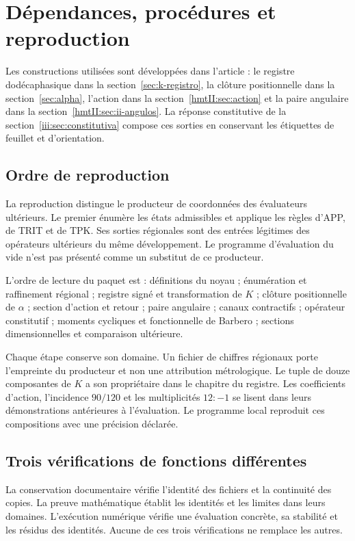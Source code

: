 \section{Dépendances, procédures et reproduction}

Les constructions utilisées sont développées dans l’article :
le registre dodécaphasique dans la section~\ref{sec:k-registro}, la clôture
positionnelle dans la section~\ref{sec:alpha}, l’action dans la
section~\ref{hmtII:sec:action} et la paire angulaire dans la
section~\ref{hmtII:sec:ii-angulos}. La réponse constitutive de la
section~\ref{iii:sec:constitutiva} compose ces sorties en conservant
les étiquettes de feuillet et d’orientation.

\subsection{Ordre de reproduction}

La reproduction distingue le producteur de coordonnées des évaluateurs
ultérieurs. Le premier énumère les états admissibles et applique les règles
d’APP, de TRIT et de TPK. Ses sorties régionales sont des entrées légitimes des
opérateurs ultérieurs du même développement. Le programme d’évaluation
du vide n’est pas présenté comme un substitut de ce producteur.

L’ordre de lecture du paquet est : définitions du noyau ; énumération
et raffinement régional ; registre signé et transformation de $K$ ;
clôture positionnelle de $\alpha$ ; section d’action et retour ; paire angulaire ;
canaux contractifs ; opérateur constitutif ; moments cycliques et fonctionnelle
de Barbero ; sections dimensionnelles et comparaison ultérieure.

Chaque étape conserve son domaine. Un fichier de chiffres régionaux porte
l’empreinte du producteur et non une attribution métrologique. Le tuple de douze
composantes de $K$ a son propriétaire dans le chapitre du registre. Les
coefficients d’action, l’incidence $90/120$ et les multiplicités
$12:-1$ se lisent dans leurs démonstrations antérieures à l’évaluation. Le
programme local reproduit ces compositions avec une précision déclarée.

\subsection{Trois vérifications de fonctions différentes}

La conservation documentaire vérifie l’identité des fichiers et la continuité
des copies. La preuve mathématique établit les identités et les limites
dans leurs domaines. L’exécution numérique vérifie une évaluation concrète,
sa stabilité et les résidus des identités. Aucune de ces trois
vérifications ne remplace les autres.

